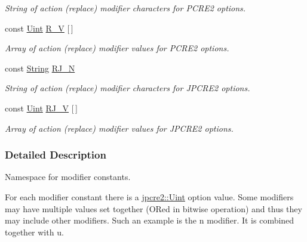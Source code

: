 \begin{DoxyCompactItemize}
\begin{DoxyCompactList}\small\item\em String of action (replace) modifier characters for P\+C\+R\+E2 options. \end{DoxyCompactList}\item 
const \hyperlink{namespacejpcre2_a078242d38221a13fb3543b9edd78c099}{Uint} \hyperlink{namespacejpcre2_1_1MOD_adde7332e9b90d54c907c30dfa9fbc4d6}{R\+\_\+V} \mbox{[}$\,$\mbox{]}\hypertarget{namespacejpcre2_1_1MOD_adde7332e9b90d54c907c30dfa9fbc4d6}{}\label{namespacejpcre2_1_1MOD_adde7332e9b90d54c907c30dfa9fbc4d6}

\begin{DoxyCompactList}\small\item\em Array of action (replace) modifier values for P\+C\+R\+E2 options. \end{DoxyCompactList}\item 
const \hyperlink{namespacejpcre2_a91f03070152fb228bc116c5a737f1d16}{String} \hyperlink{namespacejpcre2_1_1MOD_a8d13695c0e0355460cef4f7b96076210}{R\+J\+\_\+N}\hypertarget{namespacejpcre2_1_1MOD_a8d13695c0e0355460cef4f7b96076210}{}\label{namespacejpcre2_1_1MOD_a8d13695c0e0355460cef4f7b96076210}

\begin{DoxyCompactList}\small\item\em String of action (replace) modifier characters for J\+P\+C\+R\+E2 options. \end{DoxyCompactList}\item 
const \hyperlink{namespacejpcre2_a078242d38221a13fb3543b9edd78c099}{Uint} \hyperlink{namespacejpcre2_1_1MOD_a30011385a69e77d8681517c621c2a140}{R\+J\+\_\+V} \mbox{[}$\,$\mbox{]}\hypertarget{namespacejpcre2_1_1MOD_a30011385a69e77d8681517c621c2a140}{}\label{namespacejpcre2_1_1MOD_a30011385a69e77d8681517c621c2a140}

\begin{DoxyCompactList}\small\item\em Array of action (replace) modifier values for J\+P\+C\+R\+E2 options. \end{DoxyCompactList}\end{DoxyCompactItemize}


\subsubsection{Detailed Description}
Namespace for modifier constants. 

For each modifier constant there is a \hyperlink{namespacejpcre2_a078242d38221a13fb3543b9edd78c099}{jpcre2\+::\+Uint} option value. Some modifiers may have multiple values set together (O\+Red in bitwise operation) and thus they may include other modifiers. Such an example is the \textquotesingle{}n\textquotesingle{} modifier. It is combined together with \textquotesingle{}u\textquotesingle{}. 